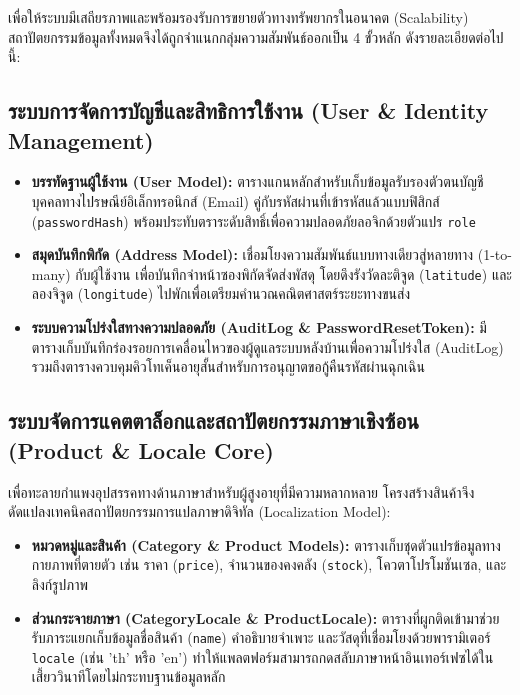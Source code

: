 เพื่อให้ระบบมีเสถียรภาพและพร้อมรองรับการขยายตัวทางทรัพยากรในอนาคต (Scalability) สถาปัตยกรรมข้อมูลทั้งหมดจึงได้ถูกจำแนกกลุ่มความสัมพันธ์ออกเป็น 4 ขั้วหลัก ดังรายละเอียดต่อไปนี้:

\subsection{ระบบการจัดการบัญชีและสิทธิการใช้งาน (User \& Identity Management)}
\begin{itemize}
    \item \textbf{บรรทัดฐานผู้ใช้งาน (User Model):} ตารางแกนหลักสำหรับเก็บข้อมูลรับรองตัวตนบัญชีบุคคลทางไปรษณีย์อิเล็กทรอนิกส์ (Email) คู่กับรหัสผ่านที่เข้ารหัสแล้วแบบฟิสิกส์ (\texttt{passwordHash}) พร้อมประทับตราระดับสิทธิ์เพื่อความปลอดภัยลอจิกด้วยตัวแปร \texttt{role}
    \item \textbf{สมุดบันทึกพิกัด (Address Model):} เชื่อมโยงความสัมพันธ์แบบทางเดียวสู่หลายทาง (1-to-many) กับผู้ใช้งาน เพื่อบันทึกจ่าหน้าซองพิกัดจัดส่งพัสดุ โดยดึงรังวัดละติจูด (\texttt{latitude}) และลองจิจูด (\texttt{longitude}) ไปพักเพื่อเตรียมคำนวณคณิตศาสตร์ระยะทางขนส่ง
    \item \textbf{ระบบความโปร่งใสทางความปลอดภัย (AuditLog \& PasswordResetToken):} มีตารางเก็บบันทึกร่องรอยการเคลื่อนไหวของผู้ดูแลระบบหลังบ้านเพื่อความโปร่งใส (AuditLog) รวมถึงตารางควบคุมคิวโทเค็นอายุสั้นสำหรับการอนุญาตขอกู้คืนรหัสผ่านฉุกเฉิน
\end{itemize}

\subsection{ระบบจัดการแคตตาล็อกและสถาปัตยกรรมภาษาเชิงซ้อน (Product \& Locale Core)}
เพื่อทะลายกำแพงอุปสรรคทางด้านภาษาสำหรับผู้สูงอายุที่มีความหลากหลาย โครงสร้างสินค้าจึงดัดแปลงเทคนิคสถาปัตยกรรมการแปลภาษาดิจิทัล (Localization Model):
\begin{itemize}
    \item \textbf{หมวดหมู่และสินค้า (Category \& Product Models):} ตารางเก็บชุดตัวแปรข้อมูลทางกายภาพที่ตายตัว เช่น ราคา (\texttt{price}), จำนวนของคงคลัง (\texttt{stock}), โควตาโปรโมชันเซล, และลิงก์รูปภาพ
    \item \textbf{ส่วนกระจายภาษา (CategoryLocale \& ProductLocale):} ตารางที่ผูกติดเข้ามาช่วยรับภาระแยกเก็บข้อมูลชื่อสินค้า (\texttt{name}) คำอธิบายจำเพาะ และวัสดุที่เชื่อมโยงด้วยพารามิเตอร์ \texttt{locale} (เช่น 'th' หรือ 'en') ทำให้แพลตฟอร์มสามารถกดสลับภาษาหน้าอินเทอร์เฟซได้ในเสี้ยววินาทีโดยไม่กระทบฐานข้อมูลหลัก
\end{itemize}

